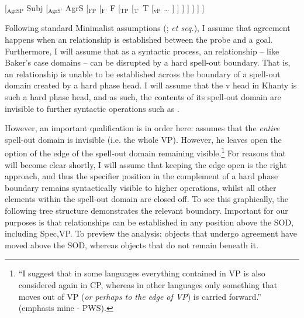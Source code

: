 \documentclass[output=paper
,modfonts
,nonflat]{langsci/langscibook}
\begin{document}
\begin{exe}
\ex
{[$_{\textrm{AgrSP}}$ Subj [$_{\textrm{AgrS'}}$ AgrS [$_{\textrm{FP}}$  [$_{\textrm{F'}}$ F [$_{\textrm{TP}}$  [$_{\textrm{T'}}$ T [$_{\textrm{vP}}$ {\ldots} ] ] ] ] ] ] ]}
\end{exe}

\noindent Following standard Minimalist assumptions (\citealt{Chomsky2000,Chomsky2001}; \emph{et seq.}), I assume that agreement happens when an \agree{} relationship is established between the probe and a goal. 
Furthermore, I will assume that as a syntactic process, an \agree{} relationship -- like Baker's case domains -- can be disrupted by a hard spell-out boundary. That is, an \agree{} relationship is unable to be established across the boundary of a spell-out domain created by a hard phase head.
I will assume that the v head in Khanty is such a hard phase head, and as such, the contents of its spell-out domain are invisible to further syntactic operations such as \agree.

However, an important qualification is in order here: \citet{Baker2015} assumes that the \emph{entire} spell-out domain is invisible (i.e. the whole VP). However, he leaves open the option of the edge of the spell-out domain remaining visible.\footnote{``I suggest that in some languages everything contained in VP is also considered again in CP, whereas in other languages only something that moves out of VP (\emph{or perhaps to the edge of VP}) is carried forward.'' \parencite[][149]{Baker2015} (emphasis mine - PWS).} 
For reasons that will become clear shortly, I will assume that keeping the edge open is the right approach, and thus the specifier position in the complement of a hard phase boundary remains syntactically visible to higher operations, whilst all other elements within the spell-out domain are closed off. 
To see this graphically, the following tree structure demonstrates the relevant boundary. 
Important for our purposes is that \agree{} relationships can be established in any position above the SOD, including Spec,VP.
To preview the analysis: objects that undergo agreement have moved above the SOD, whereas objects that do not remain beneath it.
 
\begin{exe}
\ex \label{ex:khantyfp}
\end{exe}
\end{document}
